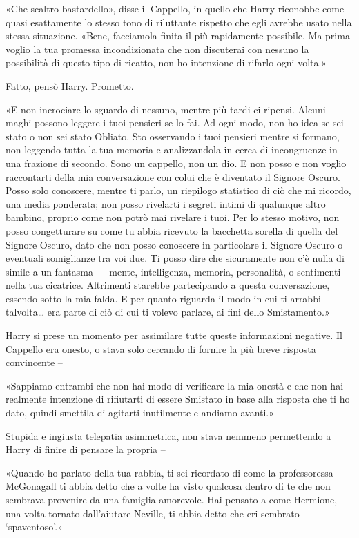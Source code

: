 «Che scaltro bastardello», disse il Cappello, in quello che Harry riconobbe come quasi esattamente lo stesso tono di riluttante rispetto che egli avrebbe usato nella stessa situazione. «Bene, facciamola finita il più rapidamente possibile. Ma prima voglio la tua promessa incondizionata che non discuterai con nessuno la possibilità di questo tipo di ricatto, non ho intenzione di rifarlo ogni volta.»

Fatto, pensò Harry. Prometto.

«E non incrociare lo sguardo di nessuno, mentre più tardi ci ripensi. Alcuni maghi possono leggere i tuoi pensieri se lo fai. Ad ogni modo, non ho idea se sei stato o non sei stato Obliato. Sto osservando i tuoi pensieri mentre si formano, non leggendo tutta la tua memoria e analizzandola in cerca di incongruenze in una frazione di secondo. Sono un cappello, non un dio. E non posso e non voglio raccontarti della mia conversazione con colui che è diventato il Signore Oscuro. Posso solo conoscere, mentre ti parlo, un riepilogo statistico di ciò che mi ricordo, una media ponderata; non posso rivelarti i segreti intimi di qualunque altro bambino, proprio come non potrò mai rivelare i tuoi. Per lo stesso motivo, non posso congetturare su come tu abbia ricevuto la bacchetta sorella di quella del Signore Oscuro, dato che non posso conoscere in particolare il Signore Oscuro o eventuali somiglianze tra voi due. Ti posso dire che sicuramente non c’è nulla di simile a un fantasma — mente, intelligenza, memoria, personalità, o sentimenti — nella tua cicatrice. Altrimenti starebbe partecipando a questa conversazione, essendo sotto la mia falda. E per quanto riguarda il modo in cui ti arrabbi talvolta… era parte di ciò di cui ti volevo parlare, ai fini dello Smistamento.»

Harry si prese un momento per assimilare tutte queste informazioni negative. Il Cappello era onesto, o stava solo cercando di fornire la più breve risposta convincente –

«Sappiamo entrambi che non hai modo di verificare la mia onestà e che non hai realmente intenzione di rifiutarti di essere Smistato in base alla risposta che ti ho dato, quindi smettila di agitarti inutilmente e andiamo avanti.»

Stupida e ingiusta telepatia asimmetrica, non stava nemmeno permettendo a Harry di finire di pensare la propria –

«Quando ho parlato della tua rabbia, ti sei ricordato di come la professoressa McGonagall ti abbia detto che a volte ha visto qualcosa dentro di te che non sembrava provenire da una famiglia amorevole. Hai pensato a come Hermione, una volta tornato dall’aiutare Neville, ti abbia detto che eri sembrato ‘spaventoso’.»

